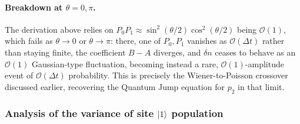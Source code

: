 \documentclass[a4paper,12pt]{article}
\begin{document}
\paragraph{Breakdown at $\theta=0,\pi$.}
The derivation above relies on $P_{0}P_{1}\approx\sin^{2}(\theta/2)\cos^{2}(\theta/2)$ being $\mathcal{O}(1)$, which fails as $\theta\to0$ or $\theta\to\pi$: there, one of $P_0,P_1$ vanishes as $\mathcal{O}(\Delta t)$ rather than staying finite, the coefficient $B-A$ diverges, and $\delta n$ ceases to behave as an $\mathcal{O}(1)$ Gaussian-type fluctuation, becoming instead a rare, $\mathcal{O}(1)$-amplitude event of $\mathcal{O}(\Delta t)$ probability. This is precisely the Wiener-to-Poisson crossover discussed earlier, recovering the Quantum Jump equation for $p_2$ in that limit.

\newpage

\subsubsection{Analysis of the variance of site $\ket{1}$ population}
\end{document}
